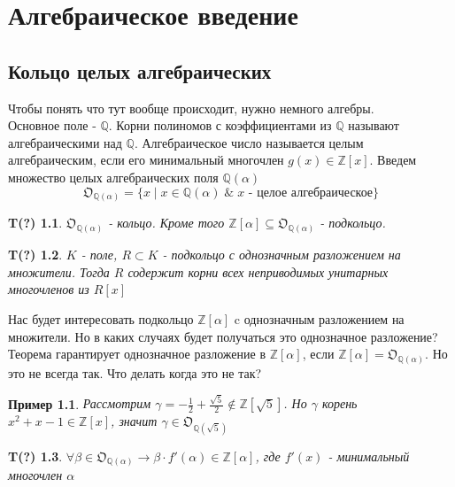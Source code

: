 \documentclass[oneside,final,14pt]{extreport}
\theoremstyle{plain}
\begin{document}
\tableofcontents
\chapter{Алгебраическое введение}
\section{Кольцо целых алгебраических}
Чтобы понять что тут вообще происходит, нужно немного алгебры.\\
Основное поле - $\mathbb{Q}$. Корни полиномов с коэффициентами из 
$\mathbb{Q}$ называют алгебраическими над $\mathbb{Q}$. Алгебраическое число называется целым алгебраическим, если его минимальный многочлен $g(x) \in \mathbb{Z}[x]$. Введем множество целых алгебраических поля 
$\mathbb{Q}(\alpha)$
$$\mathfrak{O}_{\mathbb{Q}(\alpha)}=\{x \;|\; x \in \mathbb{Q}(\alpha
)\; \& \; x\text{ - целое алгебраическое}  \}$$

\newtheorem*{theorem*}{T(?)}
\begin{theorem*}
 $\mathfrak{O}_{\mathbb{Q}(\alpha)}$ - кольцо. Кроме того  $\mathbb{Z}[\alpha] \subseteq \mathfrak{O}_{\mathbb{Q}(\alpha)}$ - подкольцо.
\end{theorem*}


\begin{theorem*}
$K$ - поле, $R \subset K$ - подкольцо с однозначным разложением на множители. Тогда $R$ содержит корни всех неприводимых унитарных многочленов из $R[x]$
\end{theorem*}

Нас будет интересовать подкольцо $\mathbb{Z}[\alpha]$ c однозначным разложением на множители. Но в каких случаях будет получаться это однозначное разложение? Теорема гарантирует однозначное разложение в 
$\mathbb{Z}[\alpha]$, если $\mathbb{Z}[\alpha]=\mathfrak{O}_{\mathbb{Q}(\alpha)}$. Но это не всегда так. Что делать когда это не так?


\newtheorem*{remark*}{Пример}
\begin{remark*}
Рассмотрим $\gamma=-\frac{1}{2}+\frac{\sqrt{5}}{2} \notin \mathbb{Z}[\sqrt{5}]$.
Но $\gamma$ корень $x^2+x-1 \in \mathbb{Z}[x]$, значит $\gamma \in \mathfrak{O}_{\mathbb{Q}(\sqrt{5})}$
\end{remark*}

\begin{theorem*}
$\forall \beta \in \mathfrak{O}_{\mathbb{Q}(\alpha)} \rightarrow \beta \cdot f'(\alpha) \in \mathbb{Z}[\alpha]$, где $f'(x)$ - минимальный многочлен $\alpha$
\end{theorem*}
\end{document}
